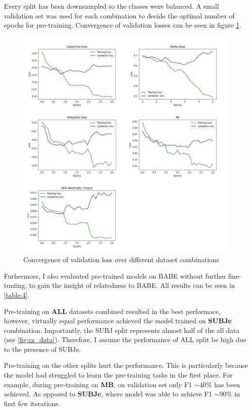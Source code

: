 Every split has been downsampled so the classes were balanced. A small validation set was used for each combination to decide the optimal number of epochs for pre-training. Convergence of validation losses can be seen in figure \ref{fig:all_losses}.
\begin{figure}
  \includegraphics[scale=0.5]{my_modules/multimedia/all_losses.png}
  \caption{Convergence of validation loss over different dataset combinations}
  \label{fig:all_losses}
\end{figure}

Furhermore, I also evaluated pre-trained models on BABE without further fine-tuniing, to gain the insight of relatedness to BABE. All results can be seen in \ref{table:4}.

Pre-training on \textbf{ALL} datasets combined resulted in the best performace, however, virtually equal performance achieved the model trained on \textbf{SUBJe} combination. Importantly, the SUBJ split represents almost half of the all data (see \ref{fig:cz_data}). Therefore, I assume the performance of ALL split be high due to the presence of SUBJe.

Pre-training on the other splits hurt the performance. This is particularly because the model had struggled to learn the pre-training tasks in the first place. For example, during pre-training on \textbf{MB}, on validation set only F1 $\sim40\%$ has been achieved. As opposed to \textbf{SUBJe}, where model was able to achieve F1 $\sim90\%$ in first few iterations.


